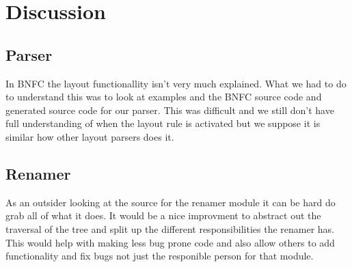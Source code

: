 \chapter{Discussion}







\section{Parser}
In BNFC the layout functionallity isn't very much explained. What we had to do to understand this was to look at examples and the BNFC source code and generated source code for our parser. This was difficult and we still don't have full understanding of when the layout rule is activated but we suppose it is similar how other layout parsers does it. %

\section{Renamer}
As an outsider looking at the source for the renamer module it can be hard do grab all of what it does. It would be a nice improvment to abstract out the traversal of the tree and split up the different responsibilities the renamer has. This would help with making less bug prone code and also allow others to add functionality and fix bugs not just the responible person for that module. 


